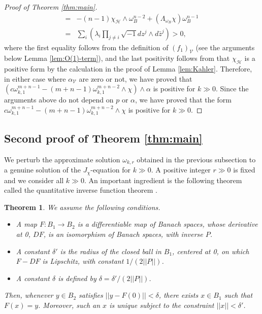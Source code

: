 \documentclass{amsart}
\numberwithin{equation}{section}
\theoremstyle{plain}
\newtheorem{theorem}[equation]{Theorem}
\theoremstyle{definition}
\theoremstyle{remark}
\begin{document}
\begin{proof}[Proof of Theorem \ref{thm:main}]
\begin{align*}
        =&-(n-1)\chi_{\mathcal{H}}\wedge\omega_B^{n-2}+(\Lambda_{\omega_B}\chi)\omega_B^{n-1}\\
        =&\sum_i\left(\lambda_i\prod_{j\neq i}\sqrt{-1}dz^j\wedge d\bar{z}^j\right)>0,
    \end{align*}
    where the first equality follows from the definition of $(f_1)_\mathcal{V}$ (see the arguments below Lemma \ref{lem:O(1)-term}), and the last positivity follows from that $\chi_{\mathcal{H}}$ is a positive form by the calculation in the proof of Lemma \ref{lem:Kahler}. Therefore, in either case where $\alpha_{\mathcal{V}}$ are zero or not, we have proved that $(c\omega_{k,1}^{m+n-1}-(m+n-1)\omega_{k, 1}^{m+n-2}\wedge\chi)\wedge\alpha$ is positive for $k\gg0$. Since the arguments above do not depend on $p$ or $\alpha$, we have proved that the form $c\omega_{k,1}^{m+n-1}-(m+n-1)\omega_{k, 1}^{m+n-2}\wedge\chi$ is positive for $k\gg0$.
\end{proof}

\subsection{Second proof of Theorem \ref{thm:main}}\label{sec:proof}
We perturb the approximate solution $\omega_{k, r}$ obtained in the previous subsection to a genuine solution of the $J_\chi$-equation for $k \gg 0$. A positive integer $r \gg 0$ is fixed and we consider all $k \gg 0$. An important ingredient is the following theorem called the quantitative inverse function theorem \cite[Theorem 4.1]{Fine}.

\begin{theorem}\label{thm:IFT} We assume the following conditions. \leavevmode
\begin{itemize}
 \item A map $F : B_1 \rightarrow B_2$ is a differentiable map of Banach spaces, whose derivative at 0, $DF$, is an isomorphism of Banach spaces, with inverse $P$.
 \item  A constant $\delta' $ is the radius of the closed ball in $B_1$, centered at 0, on which $F-DF$ is Lipschitz, with constant $1/ \left(2 || P || \right)$. 
 \item A constant $\delta$ is defined by $\delta = \delta' /(2 ||P||)$.
\end{itemize}
Then, whenever $y \in B_2$ satisfies $||y - F(0) || < \delta$, there exists $x \in B_1$ such that $F(x) = y$. Moreover, such an $x$ is unique subject to the constraint $||x|| < \delta'$.
\end{theorem}
\end{document}
